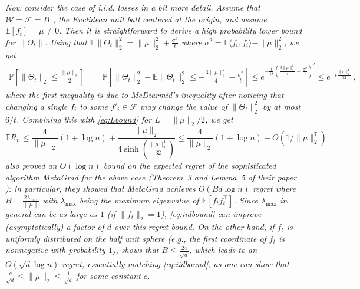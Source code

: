 \documentclass[english]{article}
\newcommand{\cW}{\mathcal{W}}
\newcommand{\cF}{\mathcal{F}}
\newcommand{\E}{\mathbb{E}}
\newcommand{\inpro}[2]{\langle #1, #2\rangle}
\newcommand{\Prob}[1]{\mathbb{P}\left[#1\right]}
\begin{document}
\begin{remark} \label{rem:iid} \em Now consider the case of i.i.d. losses in a bit more detail. Assume that $\cW=\cF=B_1$, the Euclidean unit ball centered at the origin, and assume $\E[f_t]=\mu \neq 0$.
Then it is straightforward to derive a high probability lower bound for $\|\Theta_t\|$: Using that $\E{\|\Theta_t\|_2^2} = \|\mu\|_2^2 + \frac{\sigma^2}{t}$ where $\sigma^2=\E{\inpro{f_i}{f_i}}-\|\mu\|_2^2$, we get
\begin{align*}
\Prob{\|\Theta_t\|_2 \le \frac{\|\mu\|_2}{2}} & %
= \Prob{ \|\Theta_t\|^2_2 - \E{\|\Theta_t\|^2_2} \le -\frac{3\|\mu\|_2^2}{4} - \frac{\sigma^2}{t}}
\le e^{-\frac{t}{18}\left(\frac{3\|\mu\|_2^2}{4} + \frac{\sigma^2}{t}\right)^2} \le e^{-t\frac{\|\mu\|_2^4}{32}}~,
\end{align*}
where the first inequality is due to McDiarmid's inequality \citep{BoLuMa13} after noticing that changing a single $f_i$ to some $f'_i \in \cF$ may change the value of $\|\Theta_t\|_2^2$ by at most $6/t$.
Combining this with \eqref{eq:Lbound} for $L=\|\mu\|_2/2$, we get
\begin{equation}\label{eq:iidbound}
\E{R_n} \le \frac{4}{\|\mu\|_2} (1 + \log n) + \frac{\|\mu\|_2}{4 \sinh\left(\frac{\|\mu\|_2^4}{32}\right)} 
\le  \frac{4}{\|\mu\|_2} (1 + \log n) + O(1/\|\mu\|_2^7) %
\end{equation}
\citet{koolen2016combiningA} also proved an  $O(\log n )$  bound on the expected regret of the sophisticated algorithm MetaGrad for the above case (Theorem~3 and Lemma~5 of their paper%
): in particular, they showed that MetaGrad achieves $O(Bd\log n)$ regret where $B = \frac{2\lambda_{\max}}{\|\mu\|}$ with $\lambda_{\max} $ being the maximum eigenvalue of $\E[f_tf_t^{\top}]$.
Since $\lambda_{\max}$ in general can be as large as $1$ (if $\|f_t\|_2=1$), \eqref{eq:iidbound} can improve (asymptotically) a factor of $d$ over this regret bound. On the other hand, if 
$f_t$ is uniformly distributed on the half unit sphere (e.g., the first coordinate of $f_t$ is nonnegative with probability $1$), \citet{koolen2016combiningA} shows that $B\le \frac{24}{\sqrt{d}}$, which leads to an$O(\sqrt{d}\log n)$ regret, essentially matching \eqref{eq:iidbound}, as one can show that $\frac{c}{\sqrt{d}}\le \|\mu\|_2 \le \frac{1}{\sqrt{d}}$ for some constant $c$.
\end{remark}
\end{document}
